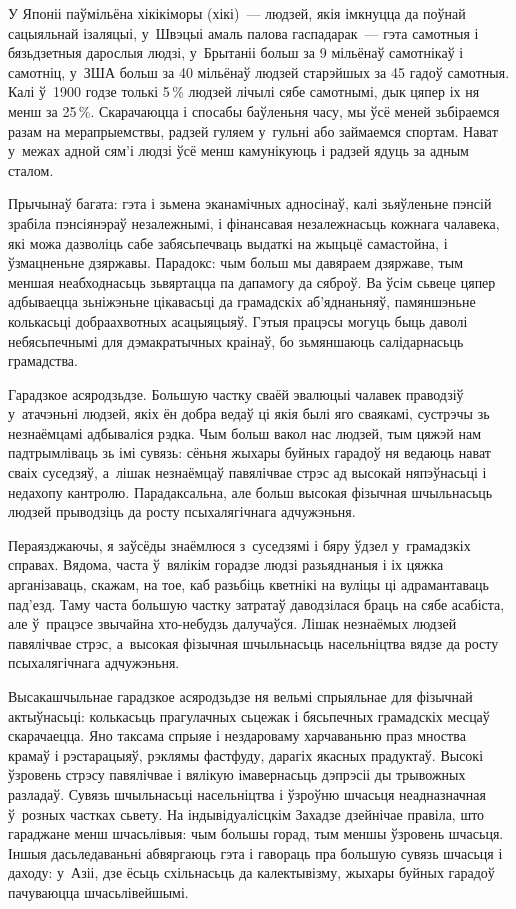 У Японіі паўмільёна хікікіморы (хікі)~--- людзей, якія імкнуцца да поўнай сацыяльнай ізаляцыі, у~Швэцыі амаль палова гаспадарак~--- гэта самотныя і бязьдзетныя дарослыя людзі, у~Брытаніі больш за 9 мільёнаў самотнікаў і самотніц, у~ЗША больш за 40 мільёнаў людзей старэйшых за 45 гадоў самотныя. Калі ў~1900 годзе толькі 5\,\% людзей лічылі сябе самотнымі, дык цяпер іх ня менш за 25\,\%. Скарачаюцца і спосабы баўленьня часу, мы ўсё меней зьбіраемся разам на мерапрыемствы, радзей гуляем у~гульні або займаемся спортам. Нават у~межах адной сям'і людзі ўсё менш камунікуюць і радзей ядуць за адным сталом.

Прычынаў багата: гэта і зьмена эканамічных адносінаў, калі зьяўленьне пэнсій зрабіла пэнсіянэраў незалежнымі, і фінансавая незалежнасьць кожнага чалавека, які можа дазволіць сабе забясьпечваць выдаткі на жыцьцё самастойна, і ўзмацненьне дзяржавы. Парадокс: чым больш мы давяраем дзяржаве, тым меншая неабходнасьць зьвяртацца па дапамогу да сяброў. Ва ўсім сьвеце цяпер адбываецца зьніжэньне цікавасьці да грамадскіх аб'яднаньняў, памяншэньне колькасьці добраахвотных асацыяцыяў. Гэтыя працэсы могуць быць даволі небясьпечнымі для дэмакратычных краінаў, бо зьмяншаюць салідарнасьць грамадства.

Гарадзкое асяродзьдзе. Большую частку сваёй эвалюцыі чалавек праводзіў у~атачэньні людзей, якіх ён добра ведаў ці якія былі яго сваякамі, сустрэчы зь незнаёмцамі адбываліся рэдка. Чым больш вакол нас людзей, тым цяжэй нам падтрымліваць зь імі сувязь: сёньня жыхары буйных гарадоў ня ведаюць нават сваіх суседзяў, а~лішак незнаёмцаў павялічвае стрэс ад высокай няпэўнасьці і недахопу кантролю. Парадаксальна, але больш высокая фізычная шчыльнасьць людзей прыводзіць да росту псыхалягічнага адчужэньня.

Пераязджаючы, я заўсёды знаёмлюся з~суседзямі і бяру ўдзел у~грамадзкіх справах. Вядома, часта ў~вялікім горадзе людзі разьяднаныя і іх цяжка арганізаваць, скажам, на тое, каб разьбіць кветнікі на вуліцы ці адрамантаваць пад'езд. Таму часта большую частку затратаў даводзілася браць на сябе асабіста, але ў~працэсе звычайна хто-небудзь далучаўся. Лішак незнаёмых людзей павялічвае стрэс, а~высокая фізычная шчыльнасьць насельніцтва вядзе да росту псыхалягічнага адчужэньня.

Высакашчыльнае гарадзкое асяродзьдзе ня вельмі спрыяльнае для фізычнай актыўнасьці: колькасьць прагулачных сьцежак і бясьпечных грамадскіх месцаў скарачаецца. Яно таксама спрыяе і нездароваму харчаваньню праз мноства крамаў і рэстарацыяў, рэклямы фастфуду, дарагіх якасных прадуктаў. Высокі ўзровень стрэсу павялічвае і вялікую імавернасьць дэпрэсіі ды трывожных разладаў. Сувязь шчыльнасьці насельніцтва і ўзроўню шчасьця неадназначная ў~розных частках сьвету. На індывідуалісцкім Захадзе дзейнічае правіла, што гараджане менш шчасьлівыя: чым большы горад, тым меншы ўзровень шчасьця. Іншыя дасьледаваньні абвяргаюць гэта і гавораць пра большую сувязь шчасьця і даходу: у~Азіі, дзе ёсьць схільнасьць да калектывізму, жыхары буйных гарадоў пачуваюцца шчасьлівейшымі.

